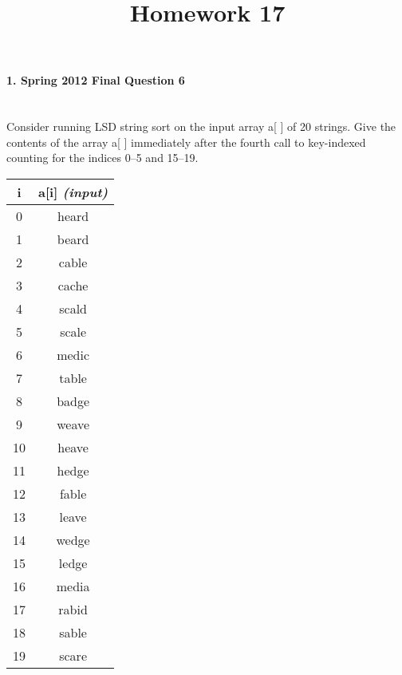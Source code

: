 \documentclass{article}
\begin{document}
\title{Homework 17}
\date{}
\maketitle


\paragraph{\Large 1. Spring 2012 Final Question 6}\mbox{}\\
Consider running LSD string sort on the input array a[ ] of 20 strings. Give the contents of the array a[ ] immediately after the fourth call to key-indexed counting for the indices 0--5 and 15--19.\\

\begin{tabular}{c | c}
i & a[i] \textit{(input)}\\ \hline
0 & heard\\ \hline
1 & beard\\ \hline
2 & cable\\ \hline
3 & cache\\ \hline
4 & scald\\ \hline
5 & scale\\ \hline
6 & medic\\ \hline
7 & table\\ \hline
8 & badge\\ \hline
9 & weave\\ \hline
10 & heave\\ \hline
11 & hedge\\ \hline
12 & fable\\ \hline
13 & leave\\ \hline
14 & wedge\\ \hline
15 & ledge\\ \hline
16 & media\\ \hline
17 & rabid\\ \hline
18 & sable\\ \hline
19 & scare
\end{tabular}
\quad\quad
\end{document}
